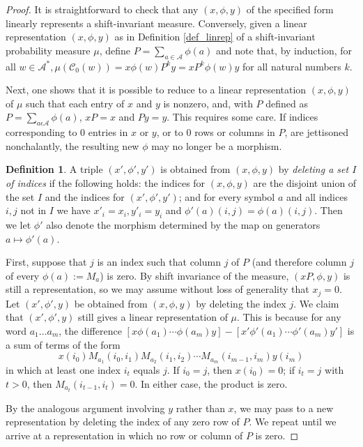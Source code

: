 \documentclass{kepart2010}
\theoremstyle{plain}
\theoremstyle{definition}
\newtheorem{defn}[thm]{Definition}
\theoremstyle{remark}
\theoremstyle{definition}
\numberwithin{equation}{section}
\begin{document}
\begin{proof}
It is straightforward to check that any $(x, \phi, y)$ of the
specified form linearly represents a shift-invariant measure.
Conversely, given a linear representation $(x, \phi, y)$ as in
Definition \ref{def_linrep} of a shift-invariant probability measure
$\mu$, define $P=\sum_{a \in {{\mathcal A}}} \phi(a)$ and note that, by
induction, for all $w \in {{\mathcal A}}^*,
\mu({{\mathcal C}}_0(w))=x\phi(w){P}^ky=x{P}^k\phi(w)y$ for all natural numbers
$k$.

Next, one shows that it is possible to reduce to a linear
representation $(x,\phi,y)$ of $\mu$ such that each entry of $x$ and
$y$ is nonzero, and, with ${P}$ defined as $P=\sum_{a\epsilon
{{\mathcal A}}}\phi(a)$, $xP=x$ and $Py=y$. This requires some care. If indices
corresponding to 0 entries in $x$ or $y$, or to 0 rows or columns in
$P$, are jettisoned nonchalantly, the resulting new $\phi$ may no
longer be a morphism.

\begin{defn}
A triple $(x',\phi',y')$ is obtained from $(x,\phi ,y)$ by {\em
deleting a set $I$ of indices} if the following holds: the indices
for $(x,\phi ,y)$ are the disjoint union of the set $I$ and the
indices for $(x',\phi',y')$; and for every symbol $a$ and all
indices $i,j$ not in $I$ we have $x'_i=x_i, y'_i=y_i$ and
$\phi'(a)(i,j)=\phi(a)(i,j)$. Then we let $\phi '$ also denote the
morphism
 determined by the map on generators
$a\mapsto \phi'(a)$.
\end{defn}

First, suppose that $j$ is an index such that column $j$ of $P$
(and therefore column $j$ of  every $\phi (a):=M_a$) is zero. By
shift
invariance of the measure, $(xP,\phi ,y)$ is still a representation,
so we may assume without loss of generality that $x_j=0$. Let
$(x',\phi ',y)$ be obtained from $(x,\phi ,y)$ by deleting the index
$j$.
We claim that $(x',\phi ',y)$ still gives a linear representation
of $\mu$. This is because for any word $a_1\dots a_m$,
the difference
$[x\phi (a_1)\cdots \phi (a_m)y]
-[x'\phi' (a_1)\cdots \phi' (a_m)y']$ is a sum of terms of the form
 \begin{equation}
x(i_0)M_{a_1}(i_0,i_1)M_{a_2}(i_1,i_2)\cdots
M_{a_m}(i_{m-1},i_m)y(i_m)
 \end{equation}
 in which at least one index
$i_t$ equals $j$. If $i_0=j$, then $x(i_0)=0$;
if $i_t=j$ with $t>0$, then
$M_{a_t}(i_{t-1},i_t)=0$. In either case, the product is zero.

By the analogous argument involving $y$ rather than $x$, we may
pass to a new representation by deleting the index of any zero
row of $P$. We repeat until we arrive at a representation in which
no row or column of $P$ is zero.


\end{proof}
\end{document}
